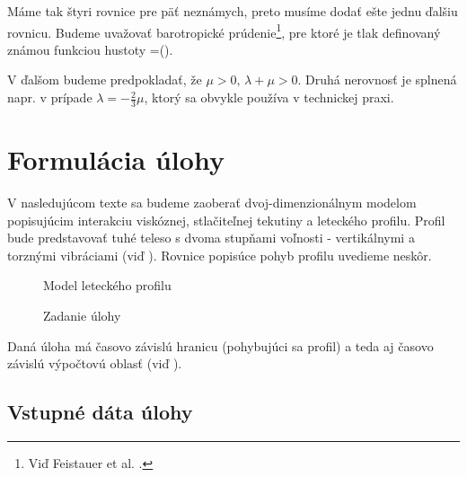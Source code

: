 Máme tak štyri rovnice pre päť neznámych, preto musíme dodať ešte jednu ďalšiu
rovnicu. Budeme uvažovať barotropické prúdenie\footnote{Viď Feistauer et al. \cite[s.
33]{feistauer}.}, pre ktoré je tlak definovaný známou funkciou hustoty
{
\pi=\widehat\pi(\rho).
}

V ďalšom budeme predpokladať, že $\mu>0,\, \lambda+\mu>0$. Druhá nerovnosť je
splnená napr. v prípade $\lambda=-\frac{2}{3}\mu$, ktorý sa obvykle používa v
technickej praxi.

\chapter{Formulácia úlohy}

V nasledujúcom texte sa budeme zaoberať dvoj-dimenzionálnym modelom popisujúcim
interakciu viskóznej, stlačiteľnej tekutiny a leteckého profilu. Profil bude predstavovať
tuhé teleso s dvoma stupňami voľnosti - vertikálnymi a torznými vibráciami (viď ). 
Rovnice popisúce pohyb profilu uvedieme neskôr.

\begin{figure}[h]
  \begin{center}
    \caption{Model leteckého profilu}
    \label{si-im-airfoil}
  \end{center}
\end{figure}

\begin{figure}[h]
  \begin{center}
    \caption{Zadanie úlohy}
    \label{si-im-setting}
  \end{center}
\end{figure}

Daná úloha má časovo závislú hranicu (pohybujúci sa profil) a teda aj časovo
závislú výpočtovú oblasť (viď ).

\section{Vstupné dáta úlohy}

